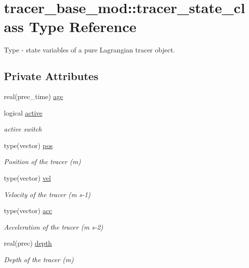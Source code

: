 \hypertarget{structtracer__base__mod_1_1tracer__state__class}{}\section{tracer\+\_\+base\+\_\+mod\+:\+:tracer\+\_\+state\+\_\+class Type Reference}
\label{structtracer__base__mod_1_1tracer__state__class}


Type -\/ state variables of a pure Lagrangian tracer object.  


\subsection*{Private Attributes}
\begin{DoxyCompactItemize}
\item 
real(prec\+\_\+time) \hyperlink{structtracer__base__mod_1_1tracer__state__class_a626e0afcfae26bbab40a6ed5e4e6d67b}{age}
\item 
logical \hyperlink{structtracer__base__mod_1_1tracer__state__class_ab32056ce018eb780a7af79f1598db58d}{active}
\begin{DoxyCompactList}\small\item\em active switch \end{DoxyCompactList}\item 
type(vector) \hyperlink{structtracer__base__mod_1_1tracer__state__class_a1b258c263cb63d6f03f08b6d969f94d7}{pos}
\begin{DoxyCompactList}\small\item\em Position of the tracer (m) \end{DoxyCompactList}\item 
type(vector) \hyperlink{structtracer__base__mod_1_1tracer__state__class_a3ea133d907fd662b8be1bdb540e2929d}{vel}
\begin{DoxyCompactList}\small\item\em Velocity of the tracer (m s-\/1) \end{DoxyCompactList}\item 
type(vector) \hyperlink{structtracer__base__mod_1_1tracer__state__class_adb9c1ee8cf97beb75d338ea0911c7fbb}{acc}
\begin{DoxyCompactList}\small\item\em Acceleration of the tracer (m s-\/2) \end{DoxyCompactList}\item 
real(prec) \hyperlink{structtracer__base__mod_1_1tracer__state__class_a4ccd21ef0bc2b596686276d2a44f2ee0}{depth}
\begin{DoxyCompactList}\small\item\em Depth of the tracer (m) \end{DoxyCompactList}\end{DoxyCompactItemize}


